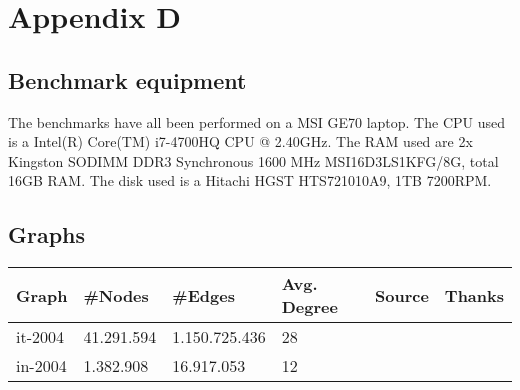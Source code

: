 \chapter{Appendix D}
\label{appendix4}
\section{Benchmark equipment}
The benchmarks have all been performed on a MSI GE70 laptop. The CPU used is a Intel(R) Core(TM) i7-4700HQ CPU @ 2.40GHz. The RAM used are 2x Kingston SODIMM DDR3 Synchronous 1600 MHz MSI16D3LS1KFG/8G, total 16GB RAM. The disk used is a Hitachi HGST HTS721010A9, 1TB 7200RPM.

\section{Graphs}

\newcommand{\graphCites}[0]{\cite{WebGraphGraphs1, WebGraphGraphs2}}

\begin{center}
\begin{tabular}{| l | l | l | l | l | l |}
\hline
    Graph    & \#Nodes    & \#Edges       & Avg. Degree & Source         & Thanks\\ \hline
    it-2004  & 41.291.594 & 1.150.725.436 & 28          & \cite{it-2004} & \graphCites \\ \hline
    in-2004  & 1.382.908  & 16.917.053    & 12          & \cite{in-2004} & \graphCites \\ \hline
\end{tabular}
\end{center}

